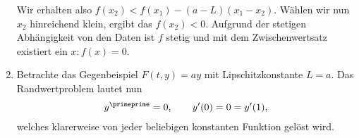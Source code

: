 \begin{solution}
\begin{enumerate}[label = \textbf{\alph*)}]
  Wir erhalten also $f(x_2) < f(x_1) - (a-L)(x_1 - x_2)$.
  Wählen wir nun $x_2$ hinreichend klein, ergibt das $f(x_2) < 0.$
  Aufgrund der stetigen Abhängigkeit von den Daten ist $f$ stetig und mit dem Zwischenwertsatz
  existiert ein $x: f(x) = 0$.
  \item Betrachte das Gegenbeispiel $F(t,y) = ay$ mit Lipschitzkonstante $L = a$. Das Randwertproblem lautet nun
  \begin{align*}
    y^{\primeprime} = 0, \qquad y^{\prime}(0) = 0 = y^{\prime}(1),
  \end{align*}
  welches klarerweise von jeder beliebigen konstanten Funktion gelöst wird.
\end{enumerate}
\end{solution}
